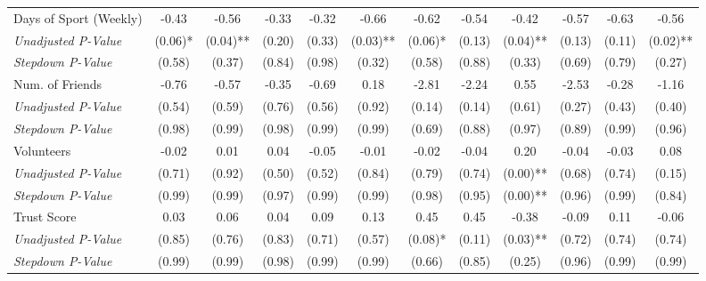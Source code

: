 \begin{tabular}{l c c c c c c c c c c c}
Days of Sport (Weekly) & -0.43 & -0.56 & -0.33 & -0.32 & -0.66 & -0.62 & -0.54 & -0.42 & -0.57 & -0.63 & -0.56 \\
\quad \textit{Unadjusted P-Value} & (0.06)* & (0.04)** & (0.20) & (0.33) & (0.03)** & (0.06)* & (0.13) & (0.04)** & (0.13) & (0.11) & (0.02)** \\
\quad \textit{Stepdown P-Value} & (0.58) & (0.37) & (0.84) & (0.98) & (0.32) & (0.58) & (0.88) & (0.33) & (0.69) & (0.79) & (0.27) \\
Num. of Friends & -0.76 & -0.57 & -0.35 & -0.69 & 0.18 & -2.81 & -2.24 & 0.55 & -2.53 & -0.28 & -1.16 \\
\quad \textit{Unadjusted P-Value} & (0.54) & (0.59) & (0.76) & (0.56) & (0.92) & (0.14) & (0.14) & (0.61) & (0.27) & (0.43) & (0.40) \\
\quad \textit{Stepdown P-Value} & (0.98) & (0.99) & (0.98) & (0.99) & (0.99) & (0.69) & (0.88) & (0.97) & (0.89) & (0.99) & (0.96) \\
Volunteers & -0.02 & 0.01 & 0.04 & -0.05 & -0.01 & -0.02 & -0.04 & 0.20 & -0.04 & -0.03 & 0.08 \\
\quad \textit{Unadjusted P-Value} & (0.71) & (0.92) & (0.50) & (0.52) & (0.84) & (0.79) & (0.74) & (0.00)** & (0.68) & (0.74) & (0.15) \\
\quad \textit{Stepdown P-Value} & (0.99) & (0.99) & (0.97) & (0.99) & (0.99) & (0.98) & (0.95) & (0.00)** & (0.96) & (0.99) & (0.84) \\
Trust Score & 0.03 & 0.06 & 0.04 & 0.09 & 0.13 & 0.45 & 0.45 & -0.38 & -0.09 & 0.11 & -0.06 \\
\quad \textit{Unadjusted P-Value} & (0.85) & (0.76) & (0.83) & (0.71) & (0.57) & (0.08)* & (0.11) & (0.03)** & (0.72) & (0.74) & (0.74) \\
\quad \textit{Stepdown P-Value} & (0.99) & (0.99) & (0.98) & (0.99) & (0.99) & (0.66) & (0.85) & (0.25) & (0.96) & (0.99) & (0.99) \\
\bottomrule
\end{tabular}
